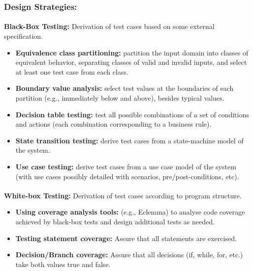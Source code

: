 \documentclass[../ESOF_notes.tex]{subfiles}
\begin{document}
            \subsubsection{Design Strategies:}
            \paragraph{}
            \textbf{Black-Box Testing:} Derivation of test 
            cases based on some external specification.
            \begin{itemize}
                \item \textbf{Equivalence class partitioning:} 
                partition the input domain into classes of equivalent 
                behavior, separating classes of valid and invalid 
                inputs, and select at least one test case from each
                class.
                \item \textbf{Boundary value analysis:} select test 
                values at the boundaries of each partition 
                (e.g., immediately below and above), besides typical 
                values.
                \item \textbf{Decision table testing:} test all possible 
                combinations of a set of conditions and actions 
                (each combination corresponding to a business rule). 
                \item \textbf{State transition testing:} derive test 
                cases from a state-machine model of the system.
                \item \textbf{Use case testing:} derive test cases 
                from a use case model of the system (with use cases 
                possibly detailed with scenarios, pre/post-conditions, 
                etc).
            \end{itemize}
            \paragraph{}
            \textbf{White-box Testing:} Derivation of test 
            cases according to program structure.
            \begin{itemize}
                \item \textbf{Using coverage analysis tools:} (e.g., Eclemma)
                to analyse code coverage achieved by black-box tests
                and design additional tests as needed.
                \item  \textbf{Testing statement coverage:} Assure that 
                all statements are exercised.
                \item \textbf{Decision/Branch coverage:} Assure that all decisions
                (if, while, for, etc.) take both values true and false. 
            \end{itemize} 
\end{document}
